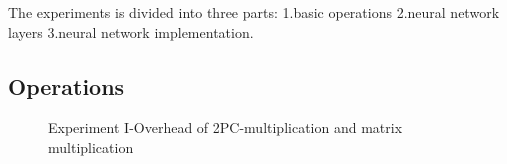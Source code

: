 \documentclass[letterpaper]{article} %
\begin{document}
    The experiments is divided into three parts: 1.basic operations 2.neural network layers 3.neural network implementation.

    \subsection{Operations}


    \begin{figure}[htbp]
        \caption{Experiment I-Overhead of 2PC-multiplication and matrix multiplication}
        \label{multiplication and matrix multiplication}

    \end{figure}
\end{document}

